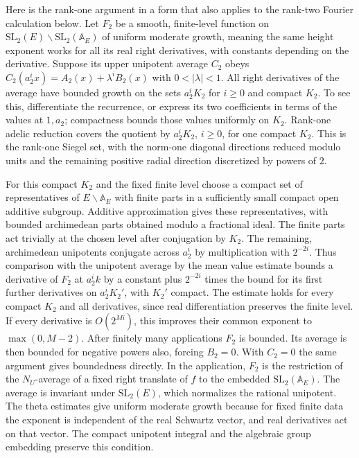 Here is the rank-one argument in a form that also applies to the
rank-two Fourier calculation below. Let \(F_2\) be a smooth,
finite-level function on \(\mathrm{SL}_2(E)\backslash\mathrm{SL}_2(\mathbb A_E)\)
of uniform moderate growth, meaning the same height exponent works
for all its real right derivatives, with constants depending on the
derivative. Suppose its upper unipotent average \(C_2\) obeys
\(C_2(a_2^i x)=A_2(x)+\lambda^i B_2(x)\) with \(0<|\lambda|<1\).
All right derivatives of the average have bounded growth on the sets
\(a_2^i K_2\) for \(i\ge0\) and compact \(K_2\). To see this,
differentiate the recurrence, or express its two coefficients in
terms of the values at \(1,a_2\); compactness bounds those values
uniformly on \(K_2\). Rank-one adelic reduction covers the quotient
by \(a_2^i K_2\), \(i\ge0\), for one compact \(K_2\). This is the
rank-one Siegel set, with the norm-one diagonal directions reduced
modulo units and the remaining positive radial direction discretized
by powers of \(2\).

For this compact \(K_2\) and the fixed finite level choose a compact
set of representatives of \(E\backslash\mathbb A_E\) with finite
parts in a sufficiently small compact open additive subgroup.
Additive approximation gives these representatives, with bounded
archimedean parts obtained modulo a fractional ideal. The finite
parts act trivially at the chosen level after conjugation by \(K_2\).
The remaining, archimedean unipotents conjugate across \(a_2^i\)
by multiplication with \(2^{-2i}\). Thus comparison with the
unipotent average by the mean value estimate bounds a derivative of
\(F_2\) at \(a_2^i k\) by a constant plus \(2^{-2i}\) times the
bound for its first further derivatives on \(a_2^i K_2'\), with
\(K_2'\) compact. The estimate holds for every compact \(K_2\) and
all derivatives, since real differentiation preserves the finite
level. If every derivative is \(O(2^{Mi})\), this improves their
common exponent to \(\max(0,M-2)\). After finitely many applications
\(F_2\) is bounded. Its average is then bounded for negative powers
also, forcing \(B_2=0\). With \(C_2=0\) the same argument gives
boundedness directly. In the application, \(F_2\) is the restriction
of the \(N_U\)-average of a fixed right translate of \(f\) to the
embedded \(\mathrm{SL}_2(\mathbb A_E)\). The average is invariant
under \(\mathrm{SL}_2(E)\), which normalizes the rational unipotent.
The theta estimates give uniform moderate growth because for fixed
finite data the exponent is independent of the real Schwartz vector,
and real derivatives act on that vector. The compact unipotent
integral and the algebraic group embedding preserve this condition.

